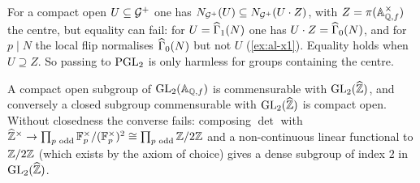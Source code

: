\begin{remark}\label{rem:normaliser-centre}
For a compact open $U \subseteq \mathcal{G}^{+}$ one has
$N_{\mathcal{G}^{+}}(U) \subseteq N_{\mathcal{G}^{+}}(U\cdot Z)$, with
$Z = \pi(\mathbb{A}_{\mathbb{Q},f}^{\times})$ the centre, but equality can
fail: for $U = \GammaOne[ad]{N}$ one has $U\cdot Z = \GammaZero[ad]{N}$, and
for $p \mid N$ the local flip normalises $\GammaZero[ad]{N}$ but not $U$
(\cref{ex:al-x1}). Equality holds when $U \supseteq Z$. So passing to
$\PGL{2}{}$ is only harmless for groups containing the centre.
\end{remark}

\begin{remark}\label{rem:compact-vs-commensurable}
A compact open subgroup of $\GL{2}{\FiniteAdeles{\QQ}}$ is commensurable with
$\GL{2}{\ProfiniteIntegers}$, and conversely a closed subgroup commensurable
with $\GL{2}{\ProfiniteIntegers}$ is compact open. Without closedness the
converse fails: composing $\det$ with
$\widehat{\mathbb{Z}}^{\times} \to \prod_{p \text{ odd}}
\mathbb{F}_{p}^{\times}/(\mathbb{F}_{p}^{\times})^{2} \cong \prod_{p\text{ odd}}\mathbb{Z}/2\mathbb{Z}$ and a
non-continuous linear functional to $\mathbb{Z}/2\mathbb{Z}$ (which exists by the axiom
of choice) gives a dense subgroup of index $2$ in $\GL{2}{\ProfiniteIntegers}$.
\end{remark}
